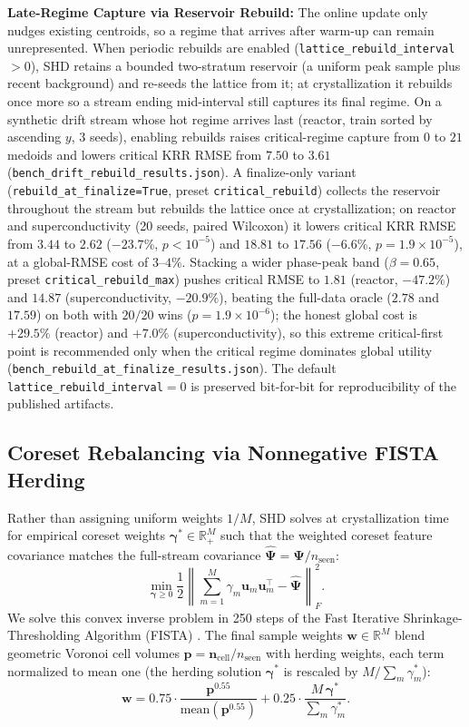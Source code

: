\documentclass[11pt,a4paper]{article}
\begin{document}
\textbf{Late-Regime Capture via Reservoir Rebuild:} The online update only nudges existing centroids, so a regime that arrives after warm-up can remain unrepresented. When periodic rebuilds are enabled (\texttt{lattice\_rebuild\_interval}$>0$), SHD retains a bounded two-stratum reservoir (a uniform peak sample plus recent background) and re-seeds the lattice from it; at crystallization it rebuilds once more so a stream ending mid-interval still captures its final regime. On a synthetic drift stream whose hot regime arrives last (reactor, train sorted by ascending $y$, 3 seeds), enabling rebuilds raises critical-regime capture from $0$ to $21$ medoids and lowers critical KRR RMSE from $7.50$ to $3.61$ (\texttt{bench\_drift\_rebuild\_results.json}). A finalize-only variant (\texttt{rebuild\_at\_finalize=True}, preset \texttt{critical\_rebuild}) collects the reservoir throughout the stream but rebuilds the lattice once at crystallization; on reactor and superconductivity (20 seeds, paired Wilcoxon) it lowers critical KRR RMSE from $3.44$ to $2.62$ ($-23.7\%$, $p<10^{-5}$) and $18.81$ to $17.56$ ($-6.6\%$, $p=1.9\times10^{-5}$), at a global-RMSE cost of $3$--$4\%$. Stacking a wider phase-peak band ($\beta=0.65$, preset \texttt{critical\_rebuild\_max}) pushes critical RMSE to $1.81$ (reactor, $-47.2\%$) and $14.87$ (superconductivity, $-20.9\%$), beating the full-data oracle ($2.78$ and $17.59$) on both with $20/20$ wins ($p=1.9\times10^{-6}$); the honest global cost is $+29.5\%$ (reactor) and $+7.0\%$ (superconductivity), so this extreme critical-first point is recommended only when the critical regime dominates global utility (\texttt{bench\_rebuild\_at\_finalize\_results.json}). The default \texttt{lattice\_rebuild\_interval}$=0$ is preserved bit-for-bit for reproducibility of the published artifacts.

\subsection{Coreset Rebalancing via Nonnegative FISTA Herding}
Rather than assigning uniform weights $1/M$, SHD solves at crystallization time for empirical coreset weights $\boldsymbol{\gamma}^* \in \mathbb{R}_+^M$ such that the weighted coreset feature covariance matches the full-stream covariance $\hat{\boldsymbol{\Psi}} = \boldsymbol{\Psi} / n_{\text{seen}}$:
\begin{equation}
    \min_{\boldsymbol{\gamma} \ge 0} \frac{1}{2} \left\| \sum_{m=1}^M \gamma_m \mathbf{u}_m \mathbf{u}_m^\top - \hat{\boldsymbol{\Psi}} \right\|_F^2.
\end{equation}
We solve this convex inverse problem in 250 steps of the Fast Iterative Shrinkage-Thresholding Algorithm (FISTA) \citep{beck2009fast}. The final sample weights $\mathbf{w} \in \mathbb{R}^M$ blend geometric Voronoi cell volumes $\mathbf{p} = \mathbf{n}_{\text{cell}} / n_{\text{seen}}$ with herding weights, each term normalized to mean one (the herding solution $\boldsymbol{\gamma}^*$ is rescaled by $M / \sum_m \gamma^*_m$):
\begin{equation}
    \mathbf{w} = 0.75 \cdot \frac{\mathbf{p}^{0.55}}{\text{mean}(\mathbf{p}^{0.55})} + 0.25 \cdot \frac{M\,\boldsymbol{\gamma}^*}{\sum_m \gamma^*_m}.
\end{equation}
\end{document}
